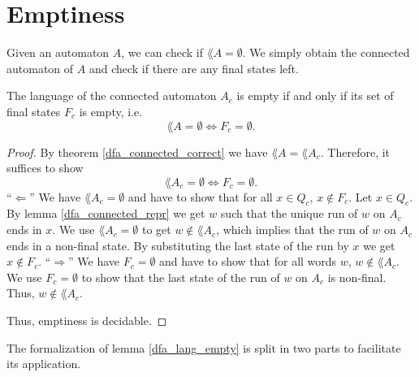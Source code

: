 \section{Emptiness}

Given an automaton $A$, we can check if $\lang{A} = \emptyset$. We simply obtain the connected automaton of $A$ and check if there are any final states left. 

\begin{theorem}
    \label{dfa_lang_empty}
    The language of the connected automaton $A_c$ is empty if and only if its set of final states $F_c$ is empty, i.e.
    \begin{equation*}
        \lang{A} = \emptyset \iff F_c = \emptyset.
    \end{equation*}
\end{theorem}

\begin{proof}
    By theorem \ref{dfa_connected_correct} we have $\lang{A} = \lang{A_c}$.
    Therefore, it suffices to show
    \begin{equation*}
        \lang{A_c} = \emptyset \iff F_c = \emptyset.
    \end{equation*}
    ``$\Leftarrow$''
    We have $\lang{A_c} = \emptyset$ and have to show that for all $x \in Q_c$, $x \notin F_c$.
    Let $x \in Q_c$. 
    By lemma \ref{dfa_connected_repr} we get $w$ such that the unique run of $w$ on $A_c$
    ends in $x$. 
    We use $\lang{A_c} = \emptyset$ to get $w \notin \lang{A_c}$, 
    which implies that the run of $w$ on $A_c$ ends in a non-final state.
    By substituting the last state of the run by $x$ we get $x \notin F_c$.
    ``$\Rightarrow$''
    We have $F_c = \emptyset$ and have to show that for all words $w$, $w \notin \lang{A_c}$.
    We use $F_c = \emptyset$ to show that the last state of the run of $w$ on $A_c$ is non-final.
    Thus, $w \notin \lang{A_c}$.

    Thus, emptiness is decidable.
\end{proof}



The formalization of lemma \ref{dfa_lang_empty} is split in two parts to facilitate its application. 




